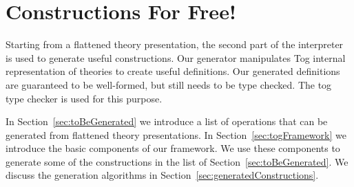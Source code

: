 \chapter{Constructions For Free!}
\label{ch:generation}

Starting from a flattened theory presentation, the second part of the interpreter is used to generate useful constructions. Our generator manipulates Tog internal representation of theories to create useful definitions. Our generated definitions are guaranteed to be well-formed, but still needs to be type checked. The tog type checker is used for this purpose. 

In Section~\ref{sec:toBeGenerated} we introduce a list of operations that can be generated from flattened theory presentations. In Section~\ref{sec:togFramework} we introduce the basic components of our framework. We use these components to generate some of the constructions in the list of Section~\ref{sec:toBeGenerated}. We discuss the generation algorithms in Section~\ref{sec:generatedConstructions}. 

